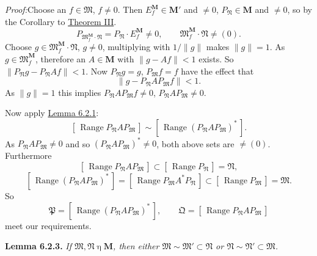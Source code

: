 \documentclass[12pt,b5paper,twoside]{article}
\newcommand{\M}{\mathbf M}
\newcommand{\clos}[1]{[\,#1\,]}
\newcommand{\Lemma}[1]{%
  \par\smallskip\noindent\phantomsection\label{lem:#1}\textbf{Lemma #1.}\enspace
}
\newcommand{\Proof}{\par\noindent\textit{Proof:}\enspace}
\newcommand{\lemref}[1]{\hyperref[lem:#1]{Lemma #1}}
\newcommand{\thmref}[1]{\hyperref[thm:#1]{Theorem #1}}
\begin{document}
\Proof Choose an \(f\in\mathfrak M\), \(f\ne0\). Then
\(E_f^{\M}\in\M'\) and \(\ne0\), \(P_{\mathfrak N}\in\M\) and
\(\ne0\), so by the Corollary to \thmref{III}.
\[
 P_{\mathfrak M_f^{\M}\cdot\mathfrak N}
   =P_{\mathfrak N}\cdot E_f^{\M}\ne0,
 \qquad
 \mathfrak M_f^{\M}\cdot\mathfrak N\ne(0).
\]
Choose \(g\in\mathfrak M_f^{\M}\cdot\mathfrak N\), \(g\ne0\),
multiplying with \(1/\lVert g\rVert\) makes \(\lVert g\rVert=1\). As
\(g\in\mathfrak M_f^{\M}\), therefore an \(A\in\M\) with
\(\lVert g-Af\rVert<1\) exists. So
\(\lVert P_{\mathfrak N}g-P_{\mathfrak N}Af\rVert<1\). Now
\(P_{\mathfrak N}g=g\), \(P_{\mathfrak M}f=f\) have the effect that
\[
 \lVert g-P_{\mathfrak N}AP_{\mathfrak M}f\rVert<1.
\]
As \(\lVert g\rVert=1\) this implies
\(P_{\mathfrak N}AP_{\mathfrak M}f\ne0\),
\(P_{\mathfrak N}AP_{\mathfrak M}\ne0\).

Now apply \lemref{6.2.1}:
\[
 \clos{\operatorname{Range}P_{\mathfrak N}AP_{\mathfrak M}}
 \sim
 \clos{\operatorname{Range}(P_{\mathfrak N}AP_{\mathfrak M})^*}.
\]
As \(P_{\mathfrak N}AP_{\mathfrak M}\ne0\) and so
\((P_{\mathfrak N}AP_{\mathfrak M})^*\ne0\), both above sets are
\(\ne(0)\). Furthermore
\[
 \clos{\operatorname{Range}P_{\mathfrak N}AP_{\mathfrak M}}
 \subset
 \clos{\operatorname{Range}P_{\mathfrak N}}=\mathfrak N,
\]
\[
 \clos{\operatorname{Range}(P_{\mathfrak N}AP_{\mathfrak M})^*}
 =\clos{\operatorname{Range}P_{\mathfrak M}A^*P_{\mathfrak N}}
 \subset
 \clos{\operatorname{Range}P_{\mathfrak M}}=\mathfrak M.
\]
So
\[
 \mathfrak P=
 \clos{\operatorname{Range}(P_{\mathfrak N}AP_{\mathfrak M})^*},
 \qquad
 \mathfrak Q=
 \clos{\operatorname{Range}P_{\mathfrak N}AP_{\mathfrak M}}
\]
meet our requirements.

\Lemma{6.2.3} {\itshape
If \(\mathfrak M,\mathfrak N\mathbin{\eta}\M\), then either
\(\mathfrak M\sim\mathfrak M'\subset\mathfrak N\) or
\(\mathfrak N\sim\mathfrak N'\subset\mathfrak M\).
}
\end{document}
